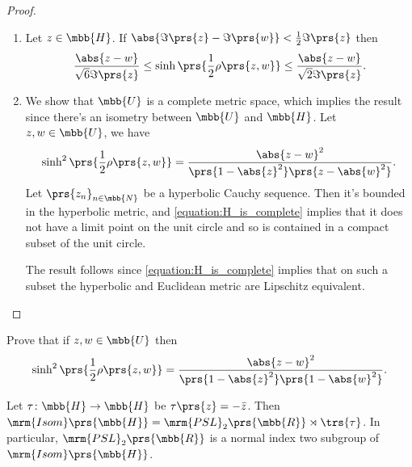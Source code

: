 \documentclass[10pt, twoside]{book}
\begin{document}
\begin{proof}
\begin{enumerate}
\item Let $z \in \mbb{H}$. If $\abs{\Im\prs{z} - \Im\prs{w}} < \frac{1}{2} \Im\prs{z}$ then
\[\frac{\abs{z-w}}{\sqrt{6} \Im\prs{z}} \leq \sinh \prs{\frac{1}{2} \rho\prs{z,w}} \leq \frac{\abs{z-w}}{\sqrt{2} \Im\prs{z}} \text{.}\]
\item We show that $\mbb{U}$ is a complete metric space, which implies the result since there's an isometry between $\mbb{U}$ and $\mbb{H}$.
Let $z,w \in \mbb{U}$, we have
\begin{align*}\label{equation:H_is_complete}
\sinh^2 \prs{\frac{1}{2} \rho\prs{z,w}} = \frac{\abs{z-w}^2}{\prs{1-\abs{z}^2}\prs{z-\abs{w}^2}} \text{.}
\end{align*}
Let $\prs{z_n}_{n \in \mbb{N}}$ be a hyperbolic Cauchy sequence. Then it's bounded in the hyperbolic metric, and \eqref{equation:H_is_complete} implies that it does not have a limit point on the unit circle and so is contained in a compact subset of the unit circle.

The result follows since \eqref{equation:H_is_complete} implies that on such a subset the hyperbolic and Euclidean metric are Lipschitz equivalent. 

\end{enumerate}
\end{proof}

\begin{exercise}
Prove that if $z,w \in \mbb{U}$ then
\[\sinh^2\prs{\frac{1}{2}\rho\prs{z,w}} = \frac{\abs{z-w}^2}{\prs{1 - \abs{z}^2} \prs{1 - \abs{w}^2}} \text{.}\]
\end{exercise}

\begin{theorem}
Let $\tau \colon \mbb{H} \to \mbb{H}$ be $\tau\prs{z} = -\bar{z}$. Then $\mrm{Isom}\prs{\mbb{H}} = \mrm{PSL}_2\prs{\mbb{R}} \rtimes \trs{\tau}$.
In particular, $\mrm{PSL}_2\prs{\mbb{R}}$ is a normal index two subgroup of $\mrm{Isom}\prs{\mbb{H}}$.
\end{theorem}
\end{document}
